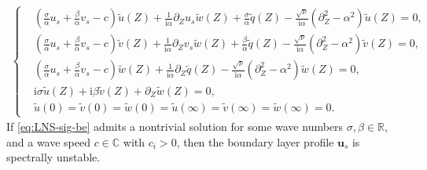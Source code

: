 \documentclass[reqno,11pt]{amsart}
\numberwithin{equation}{section}
\numberwithin{equation}{section}
\theoremstyle{plain}
\begin{document}
\begin{align}\label{eq:LNS-sig-be}
	\left\{
	\begin{aligned}
		&(\frac{\sigma}{\alpha}u_s+\frac{\beta}{\alpha}v_s-c)\tilde{u}(Z)+\frac{1}{\mathrm{i}\alpha}
\partial_Zu_s\tilde{w}(Z)+\frac{\sigma}{\alpha}\tilde{q}(Z)-\frac{\sqrt{\nu}}{\mathrm{ i}\alpha}(\partial_Z^2-\alpha^2)\tilde{u}(Z)=0,\\
		&(\frac{\sigma}{\alpha}u_s+\frac{\beta}{\alpha}v_s-c)\tilde{v}(Z)
+\frac{1}{\mathrm{i}\alpha}%
\partial_Zv_s\tilde{w}(Z)+\frac{\beta}{\alpha}\tilde{q}(Z)-\frac{\sqrt{\nu}}{\mathrm{ i}\alpha}(\partial_Z^2-\alpha^2)\tilde{v}(Z)=0,\\
		&(\frac{\sigma}{\alpha}u_s+\frac{\beta}{\alpha}v_s-c)\tilde{w}(Z)
+\frac{1}{\mathrm{i}\alpha}%
\partial_Z\tilde{q}(Z)-\frac{\sqrt{\nu}}{\mathrm{ i}\alpha}(\partial_Z^2-\alpha^2)\tilde{w}(Z)=0,\\
		&\mathrm{i}\sigma\tilde{u}(Z)+\mathrm{i}\beta\tilde{v}(Z)+\partial_Z\tilde{w}(Z)=0,\\
		&\tilde{u}(0)=\tilde{v}(0)=\tilde{w}(0)=\tilde{u}(\infty)=\tilde{v}(\infty)=\tilde{w}(\infty)=0.
	\end{aligned}
	\right.
\end{align}
If \eqref{eq:LNS-sig-be} admits a nontrivial solution for some wave numbers $\sigma, \beta\in \mathbb{R}$, and a wave speed $c\in \mathbb{C}$ with $c_i>0$, then the boundary layer profile $\textbf{u}_s$ is spectrally unstable. \\
\end{document}
